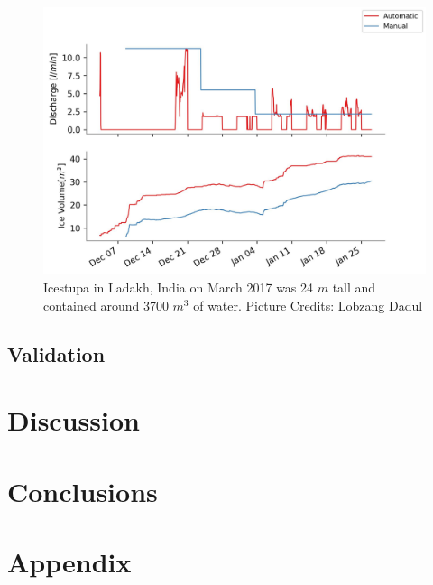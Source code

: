 \documentclass[utf8]{frontiersSCNS}
\begin{document}
\begin{figure}
	\begin{center}
		\includegraphics[width=\linewidth]{Figures/autovsmanual.jpg}
	\end{center}
	\caption{Icestupa in Ladakh, India on March 2017 was 24 $m$ tall and contained around 3700 $m^3$
		of water. Picture Credits: Lobzang Dadul}
	\label{fig:old_icestupa}
\end{figure}

\subsection{Validation}

\section{Discussion}

\section{Conclusions}

\section{Appendix}

 
\end{document}
